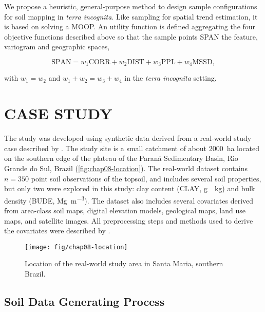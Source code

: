 We propose a heuristic, general-purpose method to design sample configurations for soil mapping in \emph{terra 
incognita}. Like sampling for spatial trend estimation, it is based on solving a MOOP. An utility function is 
defined aggregating the four objective functions described above so that the sample points SPAN the feature, 
variogram and geographic spaces,

\begin{equation}
\text{SPAN} = w_1 \text{CORR} + w_2 \text{DIST} + w_3 \text{PPL} + w_4 \text{MSSD}, 
\end{equation}\label{eq:chap08-span}

with $w_1 = w_2$ and $w_1 + w_2 = w_3 + w_4$ in the \emph{terra incognita} setting.

\section{CASE STUDY}

The study was developed using synthetic data derived from a real-world study case described by 
\citet{Samuel-RosaEtAl2015}. The study site is a small catchment of about \SI{2000}{\hectare} located on the 
southern edge of the plateau of the Paraná Sedimentary Basin, Rio Grande do Sul, Brazil 
(\autoref{fig:chap08-location}). The real-world dataset contains $n = 350$ point soil observations of the 
topsoil, and includes several soil properties, but only two were explored in this study: clay content (CLAY, 
\si{\gram\pre\kilo\gram}) and bulk density (BUDE, \si{\mega\gram\per\cubic\metre}). The dataset also includes 
several covariates derived from area-class soil maps, digital elevation models, geological maps, land use maps, 
and satellite images. All preprocessing steps and methods used to derive the covariates were described by 
\citet{Samuel-RosaEtAl2015}.

\begin{figure}[!ht]
 \centering
 \texttt{[image: fig/chap08-location]}
 \caption{Location of the real-world study area in Santa Maria, southern Brazil.}
 \label{fig:chap08-location}
\end{figure}

\subsection{Soil Data Generating Process}

